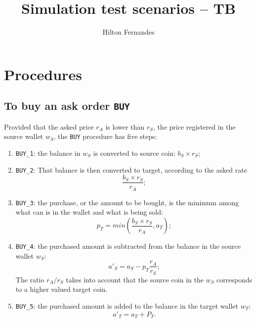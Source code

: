 \documentclass[a4paper,11pt]{article}
\author{Hilton Fernandes}
\title{Simulation test scenarios -- TB}
\begin{document}
\maketitle

\tableofcontents
\listoftables

\pagebreak

\section{Procedures}

\subsection{To buy an ask order {\tt BUY}}

Provided that the asked price $r_A$ is lower than $r_S$, the price registered in the 
source wallet $w_S$, the {\tt BUY} procedure has five steps:
\begin{enumerate}
    \item \label{itm:BUY-1} {\tt BUY\_1}: 
	the balance in $w_S$ is converted to source coin: $b_S \times r_S$;
	
    \item \label{itm:BUY-2} {\tt BUY\_2}: 
	That balance is then converted to target, according to the asked rate 
	\begin{equation*}
	    \frac{b_S \times r_S}{r_A}; 
	\end{equation*}
	
    \item \label{itm:BUY-3} {\tt BUY\_3}: 
	the purchase, or the amount to be bought, is the minimum among what can is in 
	the wallet and what is being sold:
	\begin{equation*}
	    p_T = min \left( \frac{b_S \times r_S}{r_A}, a_T \right); 
	\end{equation*}
	
    \item \label{itm:BUY-4} {\tt BUY\_4}:
	the purchased amount is subtracted from the balance in the source wallet $w_S$:
	\begin{equation*}
	    a'_S = a_S - p_T \frac{r_A}{r_S};
	\end{equation*}
	The ratio $r_A / r_S$ takes into account that the source coin in the $w_S$ corresponds
	to a higher valued target coin.
	
    \item \label{itm:BUY-5} {\tt BUY\_5}:
	the purchased amount is added to the balance in the target wallet $w_T$:
	\begin{equation*}
	    a'_T = a_T + P_T.
	\end{equation*}
	
\end{enumerate}
\end{document}
